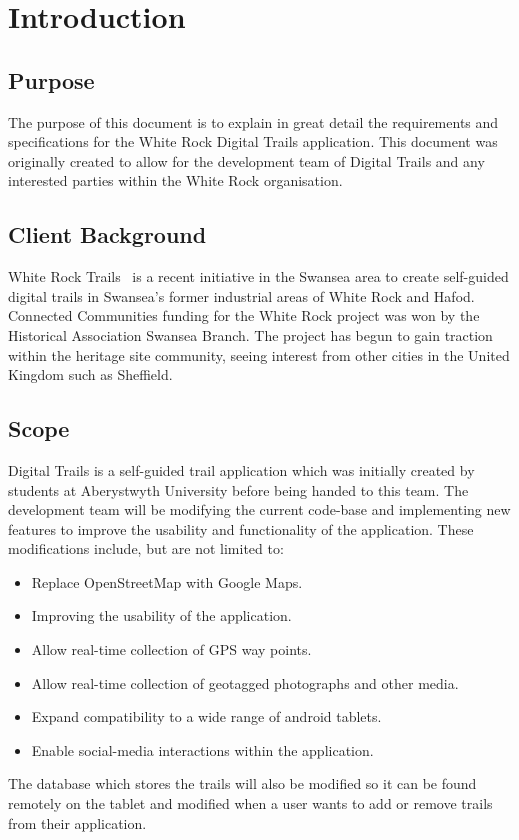 \documentclass[11pt,a4paper]{article}
\begin{document}


\newpage 

\tableofcontents

\newpage
\section{Introduction}
\subsection{Purpose}
\label{sec:purpose}
The purpose of this document is to explain in great detail the requirements and specifications for the White Rock Digital Trails application. This document was originally created to allow for the development team of Digital Trails and any interested parties within the White Rock organisation.

\subsection{Client Background}
\label{sec:client-background}
White Rock Trails~\cite{whiterock} is a recent initiative in the Swansea area to create self-guided digital trails in Swansea's former industrial areas of White Rock and Hafod. Connected Communities funding for the White Rock project was won by the Historical Association Swansea Branch. The project has begun to gain traction within the heritage site community, seeing interest from other cities in the United Kingdom such as Sheffield.

\subsection{Scope}
\label{sec:scope}
Digital Trails is a self-guided trail application which was initially created by students at Aberystwyth University before being handed to this team. The development team will be modifying the current code-base and implementing new features to improve the usability and functionality of the application.
These modifications include, but are not limited to:
\begin{itemize}
\item Replace OpenStreetMap with Google Maps.
\item Improving the usability of the application.
\item Allow real-time collection of GPS way points.
\item Allow real-time collection of geotagged photographs and other media.
\item Expand compatibility to a wide range of android tablets.
\item Enable social-media interactions within the application.
\end{itemize}
The database which stores the trails will also be modified so it can be found remotely on the tablet and modified when a user wants to add or remove trails from their application.
\end{document}
